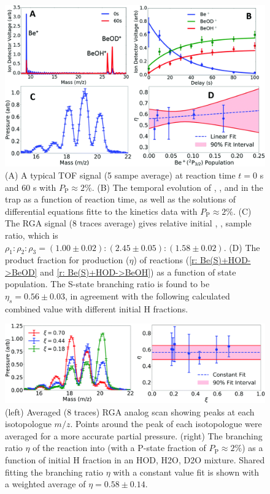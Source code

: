 \begin{figure}
	\centering
	\includegraphics[width=\textwidth]{images/Be_HOD_set.png}
	\caption{(A) A typical TOF signal (5 sampe average) at reaction time $t=0$ s and 60 s with $P_{\text{P}} \approx 2\%$. (B) The temporal evolution of , , and  in the trap as a function of reaction time, as well as the solutions of differential equations fitte to the kinetics data with $P_{\text{P}} \approx 2\%$. (C) The RGA signal (8 traces average) gives relative initial , ,  sample ratio, which is $\rho_1:\rho_2:\rho_3=(1.00 \pm 0.02):(2.45 \pm 0.05):(1.58 \pm 0.02)$. (D) The product fraction for  production ($\eta$) of reactions (\ref{r: Be(S)+HOD->BeOD} and \ref{r: Be(S)+HOD->BeOH}) as a function of  state population. The S-state branching ratio is found to be $\eta_s=0.56 \pm 0.03$, in agreement with the following calculated combined value with different initial H fractions.}
	\label{fig: Be+HOD procedure}
\end{figure}

\begin{figure}
	\centering
	\includegraphics[width=\textwidth]{images/Be_HOD_HOD_frac.png}
	\caption{(left) Averaged (8 traces) RGA analog scan showing peaks at each isotopologue $m/z$. Points around the peak of each isotopologue were averaged for a more accurate partial pressure. (right) The branching ratio $\eta$ of the reaction  into  (with a  P-state fraction of $P_{\text{P}} \approx 2\%$) as a function of initial H fraction in an HOD, H2O, D2O mixture. Shared fitting the branching ratio $\eta$ with a constant value fit is shown with a weighted average of $\eta = 0.58 \pm 0.14$.}
	\label{}
\end{figure}

